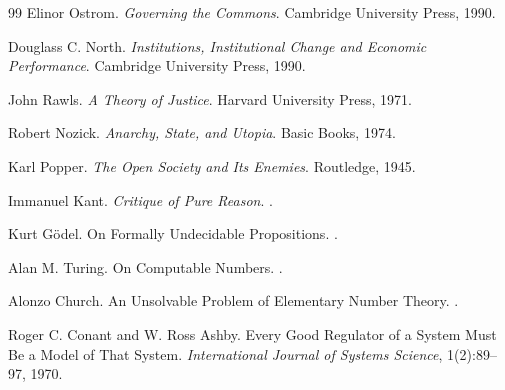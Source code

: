 \documentclass[12pt,a4paper]{article}
\begin{document}
\begin{thebibliography}{99}
Elinor Ostrom.
\newblock \emph{Governing the Commons}.
\newblock Cambridge University Press, 1990.

Douglass C. North.
\newblock \emph{Institutions, Institutional Change and Economic Performance}.
\newblock Cambridge University Press, 1990.

John Rawls.
\newblock \emph{A Theory of Justice}.
\newblock Harvard University Press, 1971.

Robert Nozick.
\newblock \emph{Anarchy, State, and Utopia}.
\newblock Basic Books, 1974.

Karl Popper.
\newblock \emph{The Open Society and Its Enemies}.
\newblock Routledge, 1945.

Immanuel Kant.
\newblock \emph{Critique of Pure Reason}.
.

Kurt Gödel.
\newblock On Formally Undecidable Propositions.
.

Alan M. Turing.
\newblock On Computable Numbers.
.

Alonzo Church.
\newblock An Unsolvable Problem of Elementary Number Theory.
.

Roger C. Conant and W. Ross Ashby.
\newblock Every Good Regulator of a System Must Be a Model of That System.
\newblock \emph{International Journal of Systems Science}, 1(2):89--97, 1970.

\end{thebibliography}
\end{document}
